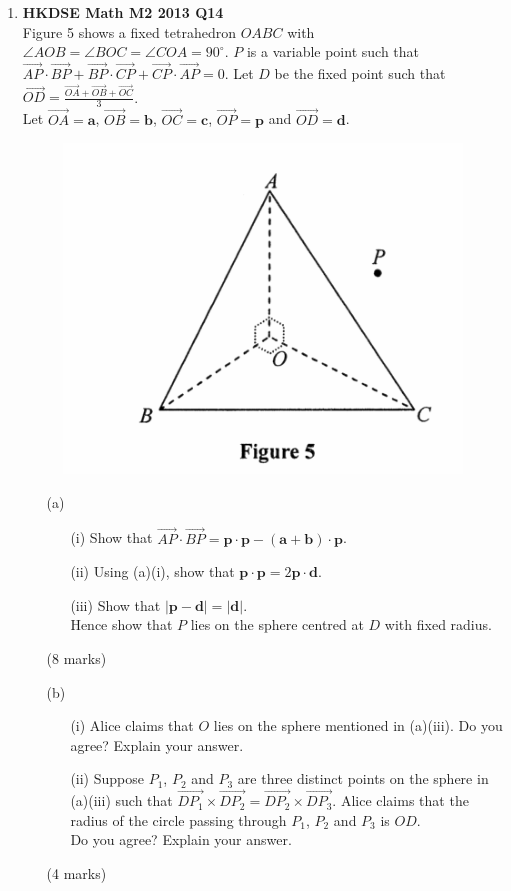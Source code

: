 \documentclass{report}
\begin{document}
\begin{enumerate}
	\item \textbf{HKDSE Math M2 2013 Q14}\\
	Figure 5 shows a fixed tetrahedron $OABC$ with $\angle AOB = \angle BOC = \angle COA = 90^{\circ}$. $P$ is a variable point such that $\overrightarrow{AP}\cdot\overrightarrow{BP} + \overrightarrow{BP}\cdot\overrightarrow{CP} + \overrightarrow{CP}\cdot\overrightarrow{AP} = 0$. Let $D$ be the fixed point such that $\overrightarrow{OD} = \displaystyle\frac{\overrightarrow{OA}+\overrightarrow{OB}+\overrightarrow{OC}}{3}$. \\
	Let $\overrightarrow{OA} = \textbf{a}$, $\overrightarrow{OB} = \textbf{b}$, $\overrightarrow{OC} = \textbf{c}$, $\overrightarrow{OP} = \textbf{p}$ and $\overrightarrow{OD} = \textbf{d}$. 
	\begin{figure}[H]
		\centering
		\includegraphics[width = .4\linewidth]{2013Figure5}
	\end{figure}
	\begin{enumerate}
		\item [(a)]
		\begin{enumerate}
			\item [(i)]Show that $\overrightarrow{AP}\cdot\overrightarrow{BP} = \textbf{p}\cdot\textbf{p} - (\textbf{a} + \textbf{b})\cdot\textbf{p}$. 
			\item [(ii)]Using (a)(i), show that $\textbf{p}\cdot\textbf{p} = 2\textbf{p}\cdot\textbf{d}$. 
			\item [(iii)]Show that $|\textbf{p} - \textbf{d}| = |\textbf{d}|$. \\
			Hence show that $P$ lies on the sphere centred at $D$ with fixed radius.
		\end{enumerate}
		(8 marks)
		\item [(b)]
		\begin{enumerate}
			\item [(i)]Alice claims that $O$ lies on the sphere mentioned in (a)(iii). Do you agree? Explain your answer. 
			\item [(ii)]Suppose $P_1$, $P_2$ and $P_3$ are three distinct points on the sphere in (a)(iii) such that $\overrightarrow{DP_1}\times\overrightarrow{DP_2} = \overrightarrow{DP_2}\times\overrightarrow{DP_3}$. Alice claims that the radius of the circle passing through $P_1$, $P_2$ and $P_3$ is $OD$. \\
			Do you agree? Explain your answer.
		\end{enumerate}
		(4 marks)
	\end{enumerate}


\end{enumerate}
\end{document}
